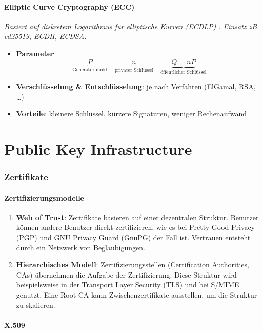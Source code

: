\documentclass{article}
\begin{document}
\subsection{Elliptic Curve Cryptography (ECC)}
\textit{Basiert auf diskretem Logarithmus für elliptische Kurven (ECDLP) . Einsatz zB. ed25519, ECDH, ECDSA.}
\begin{itemize}
  \item \textbf{Parameter}
    \[
      \underbrace{P}_\text{Generatorpunkt}\quad
      \underbrace{n}_\text{privater Schlüssel}\quad
      \underbrace{Q=nP}_\text{öffentlicher Schlüssel}
    \]
  \item \textbf{Verschlüsselung \& Entschlüsselung}: je nach Verfahren (ElGamal, RSA, …)
  \item \textbf{Vorteile}: kleinere Schlüssel, kürzere Signaturen, weniger Rechenaufwand
\end{itemize}




\part{Public Key Infrastructure}

\section{Zertifikate}

\subsection{Zertifizierungsmodelle}
\begin{enumerate}
  \item \textbf{Web of Trust}: Zertifikate basieren auf einer dezentralen Struktur. Benutzer können andere Benutzer direkt zertifizieren, wie es bei Pretty Good Privacy (PGP) und GNU Privacy Guard (GnuPG) der Fall ist. Vertrauen entsteht durch ein Netzwerk von Beglaubigungen.
  \item \textbf{Hierarchisches Modell}: Zertifizierungsstellen (Certification Authorities, CAs) übernehmen die Aufgabe der Zertifizierung. Diese Struktur wird beispielsweise in der Transport Layer Security (TLS) und bei S/MIME genutzt. Eine Root-CA kann Zwischenzertifikate ausstellen, um die Struktur zu skalieren.
\end{enumerate}

\subsection{X.509}
\end{document}
